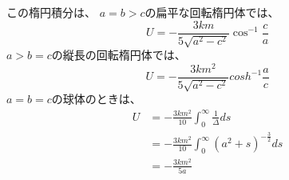 \documentclass{jsarticle}
\newcommand{\beq}{\begin{equation}}
\newcommand{\eeq}{\end{equation}}
\begin{document}
この楕円積分は、
$a=b>c$の扁平な回転楕円体では、
\beq
U = - \frac{3km}{5\sqrt{a^2-c^2}} \cos^{-1}\frac{c}{a}
\eeq
$a>b=c$の縦長の回転楕円体では、
\beq
U = - \frac{3km^2}{5 \sqrt{a^2 - c^2}}cosh^{-1} \frac{a}{c}
\eeq
$a=b=c$の球体のときは、
\begin{align}
    U &= - \frac{3km^2}{10} \int_0^\infty \frac{1}{\Delta}ds\\
      &= - \frac{3km^2}{10} \int_0^\infty (a^2 + s)^{-\frac{3}{2}}ds\\
      &= - \frac{3km^2}{5a} 
\end{align}
\end{document}
